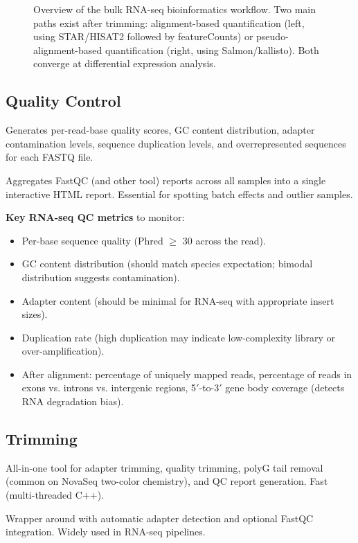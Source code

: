 \begin{figure}[htbp]
{\begin{tikzpicture}
\end{tikzpicture}%
}
\caption{Overview of the bulk RNA-seq bioinformatics workflow. Two main paths
exist after trimming: alignment-based quantification (left, using STAR/HISAT2
followed by featureCounts) or pseudo-alignment-based quantification (right,
using Salmon/kallisto). Both converge at differential expression analysis.}
\label{fig:rnaseq:workflow}
\end{figure}

\subsection{Quality Control}

\begin{description}[style=nextline]
  \item[\software{FastQC}] Generates per-read-base quality scores, GC content
    distribution, adapter contamination levels, sequence duplication levels,
    and overrepresented sequences for each FASTQ file.
  \item[\software{MultiQC}] Aggregates FastQC (and other tool) reports across
    all samples into a single interactive HTML report. Essential for spotting
    batch effects and outlier samples.
\end{description}

\textbf{Key RNA-seq QC metrics} to monitor:
\begin{itemize}[nosep]
  \item Per-base sequence quality (Phred $\geq$ 30 across the read).
  \item GC content distribution (should match species expectation; bimodal
    distribution suggests contamination).
  \item Adapter content (should be minimal for RNA-seq with appropriate insert
    sizes).
  \item Duplication rate (high duplication may indicate low-complexity library
    or over-amplification).
  \item After alignment: percentage of uniquely mapped reads, percentage of
    reads in exons vs. introns vs. intergenic regions, 5$'$-to-3$'$ gene body
    coverage (detects RNA degradation bias).
\end{itemize}

\subsection{Trimming}

\begin{description}[style=nextline]
  \item[\software{fastp}] All-in-one tool for adapter trimming, quality
    trimming, polyG tail removal (common on NovaSeq two-color chemistry),
    and QC report generation. Fast (multi-threaded C++).
  \item[\software{Trim Galore}] Wrapper around  with
    automatic adapter detection and optional FastQC integration. Widely used in
    RNA-seq pipelines.
\end{description}

